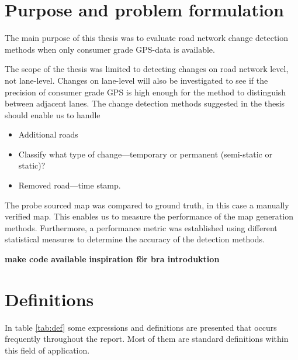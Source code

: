 \section{Purpose and problem formulation}

The main purpose of this thesis was to evaluate road network change detection methods when only consumer grade \ac{GPS}-data is available. 

The scope of the thesis was limited to detecting changes on road network level, not lane-level. Changes on lane-level will also be investigated to see if the precision of consumer grade \ac{GPS} is high enough for the method to distinguish between adjacent lanes. The change detection methods suggested in the thesis should enable us to handle %
\begin{itemize}
    \item Additional roads
    \item Classify what type of change---temporary or permanent (semi-static or static)?
    \item Removed road---time stamp.
\end{itemize}
The probe sourced map was compared to ground truth, in this case a manually verified map. This enables us to measure the performance of the map generation methods. Furthermore, a performance metric was established using different statistical measures to determine the accuracy of the detection methods. 

\textbf{make code available}
\textbf{\cite{biagioni:gis12} inspiration för bra introduktion}



\section{Definitions}

In table \ref{tab:def} some expressions and definitions are presented that occurs frequently throughout the report. Most of them are standard definitions within this field of application.


